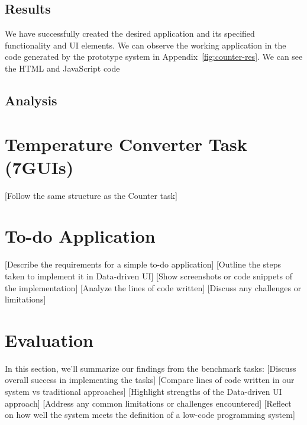 \subsection{Results}
We have successfully created the desired application and its specified functionality and UI elements.
We can observe the working application in the code generated by the prototype system in Appendix~\ref{fig:counter-res}.
We can see the HTML and JavaScript code



\subsection{Analysis}


\section{Temperature Converter Task (7GUIs)}
 [Follow the same structure as the Counter task]

\section{To-do Application}
 [Describe the requirements for a simple to-do application]
 [Outline the steps taken to implement it in Data-driven UI]
 [Show screenshots or code snippets of the implementation]
 [Analyze the lines of code written]
 [Discuss any challenges or limitations]

\section{Evaluation}
In this section, we'll summarize our findings from the benchmark tasks:
[Discuss overall success in implementing the tasks]
[Compare lines of code written in our system vs traditional approaches]
[Highlight strengths of the Data-driven UI approach]
[Address any common limitations or challenges encountered]
[Reflect on how well the system meets the definition of a low-code programming system]
